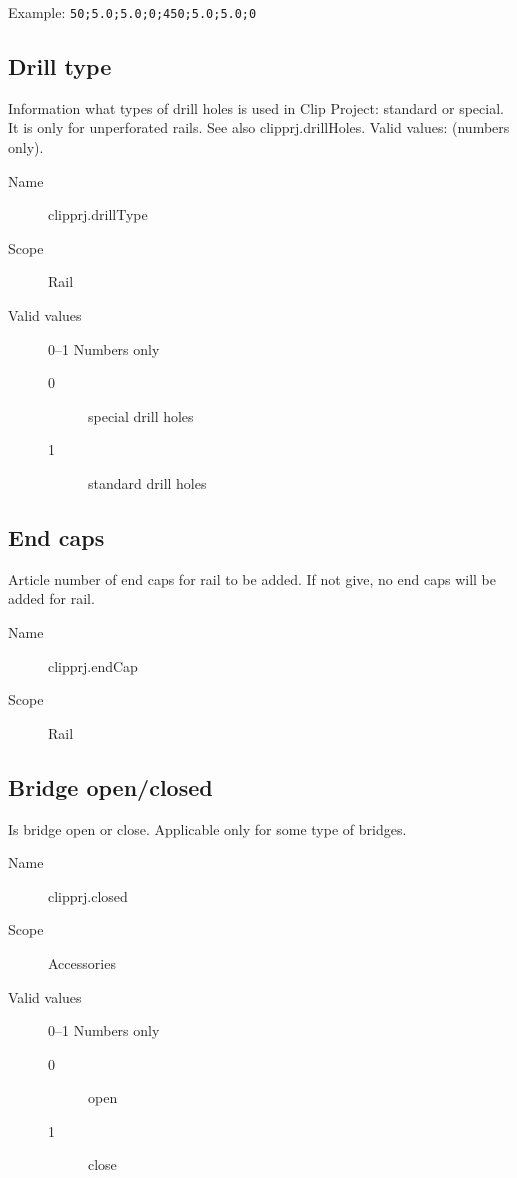 \documentclass[%
	a4paper,
	oneside,
	listof=numbered,
	parskip=half,
	headsepline=true,
	footsepline=false,
	normalheadings,
	0.7headlines,
	headexclude,
	]{scrbook}
\begin{document}
Example: \verb|50;5.0;5.0;0;450;5.0;5.0;0|

\subsection{Drill type}

Information what types of drill holes is used in Clip Project: standard or special.
It is only for unperforated rails.
See also clipprj.drillHoles.
Valid values: (numbers only).

\begin{description}
	\item[Name] clipprj.drillType
	\item[Scope] Rail
	\item[Valid values] 0--1 Numbers only
	\begin{description}
		\item[0] special drill holes
		\item[1] standard drill holes
	\end{description}
\end{description}

\subsection{End caps}

Article number of end caps for rail to be added.
If not give, no end caps will be added for rail.

\begin{description}
	\item[Name] clipprj.endCap
	\item[Scope] Rail
\end{description}

\subsection{Bridge open/closed}

Is bridge open or close.
Applicable only for some type of bridges.

\begin{description}
	\item[Name] clipprj.closed
	\item[Scope] Accessories
	\item[Valid values] 0--1 Numbers only
	\begin{description}
		\item[0] open
		\item[1] close
	\end{description}
\end{description}
\end{document}
